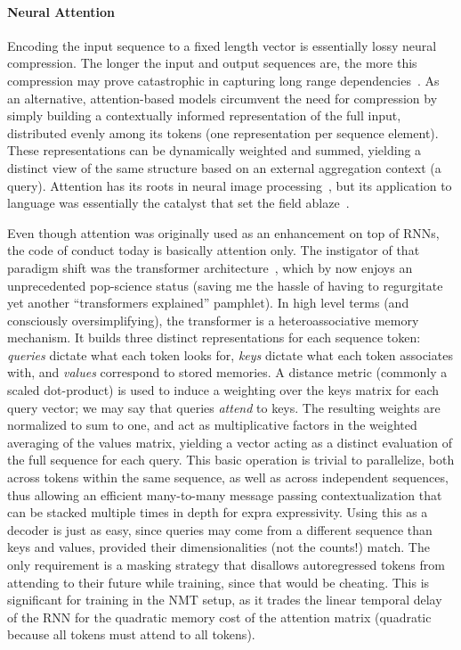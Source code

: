 \paragraph{Neural Attention}
Encoding the input sequence to a fixed length vector is essentially lossy neural compression.
The longer the input and output sequences are, the more this compression may prove catastrophic in capturing long range dependencies~\cite{cho2014properties}.
As an alternative, attention-based models circumvent the need for compression by simply building a contextually informed representation of the full input, distributed evenly among its tokens (one representation per sequence element).
These representations can be dynamically weighted and summed, yielding a distinct view of the same structure based on an external aggregation context (a query).
Attention has its roots in neural image processing~\cite[\textit{inter alia}]{larochelle2010learning,NIPS2014_09c6c378}, but its application to language was essentially the catalyst that set the field ablaze~\cite{bahdanau2015neural}.

Even though attention was originally used as an enhancement on top of RNNs, the code of conduct today is basically attention only.
The instigator of that paradigm shift was the transformer architecture~\cite{vaswani2017attention}, which by now enjoys an unprecedented pop-science status (saving me the hassle of having to regurgitate yet another ``transformers explained'' pamphlet).
In high level terms (and consciously oversimplifying), the transformer is a heteroassociative memory mechanism.
It builds three distinct representations for each sequence token: \textit{queries} dictate what each token looks for, \textit{keys} dictate what each token associates with, and \textit{values} correspond to stored memories.
A distance metric (commonly a scaled dot-product) is used to induce a weighting over the keys matrix for each query vector; we may say that queries \textit{attend} to keys.
The resulting weights are normalized to sum to one, and act as multiplicative factors in the weighted averaging of the values matrix, yielding a vector acting as a distinct evaluation of the full sequence for each query.
This basic operation is trivial to parallelize, both across tokens within the same sequence, as well as across independent sequences, thus allowing an efficient many-to-many message passing contextualization that can be stacked multiple times in depth for expra expressivity.
Using this as a decoder is just as easy, since queries may come from a different sequence than keys and values, provided their dimensionalities (not the counts!) match.
The only requirement is a masking strategy that disallows autoregressed tokens from attending to their future while training, since that would be cheating.
This is significant for training in the NMT setup, as it trades the linear temporal delay of the RNN for the quadratic memory cost of the attention matrix (quadratic because all tokens must attend to all tokens).

